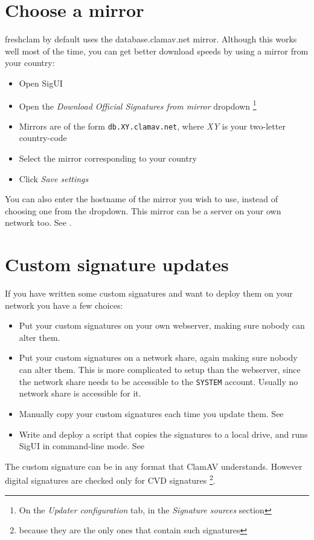 \section{Choose a mirror}
\Gls{freshclam} by default uses the \gls{database.clamav.net} \gls{mirror}. Although this works well most of the time, you can get better download speeds by using a mirror from your country:
\begin{itemize}
\item Open SigUI
\item Open the \emph{Download Official Signatures from mirror} dropdown \footnote{
On the \emph{Updater configuration} tab, in the \emph{Signature sources} section}
\item Mirrors are of the form \texttt{db.XY.clamav.net}, where \emph{XY} is your two-letter country-code
\item Select the mirror corresponding to your country
\item Click \emph{Save settings}
\end{itemize}

You can also enter the \gls{hostname} of the mirror you wish to use, instead of choosing one from the dropdown. 
This mirror can be a server on your own network too. See .

\section{Custom signature updates}
If you have written some custom signatures and want to deploy them on your network you have a few choices:
\begin{itemize}
 \item Put your custom signatures on your own webserver, making sure nobody can alter them. 
 \item Put your custom signatures on a network share, again making sure nobody can alter them.
This is more complicated to setup than the webserver, since the network share needs to be accessible to the \verb+SYSTEM+ account. Usually no network share is accessible for it.
 \item Manually copy your custom signatures each time you update them. See 
 \item Write and deploy a script that copies the signatures to a local drive, and runs SigUI in command-line mode. See 
\end{itemize}

The custom signature can be in any format that \gls{ClamAV} understands. 
However digital signatures are checked only for \gls{CVD} signatures \footnote{because they are the only ones that contain such signatures}.

